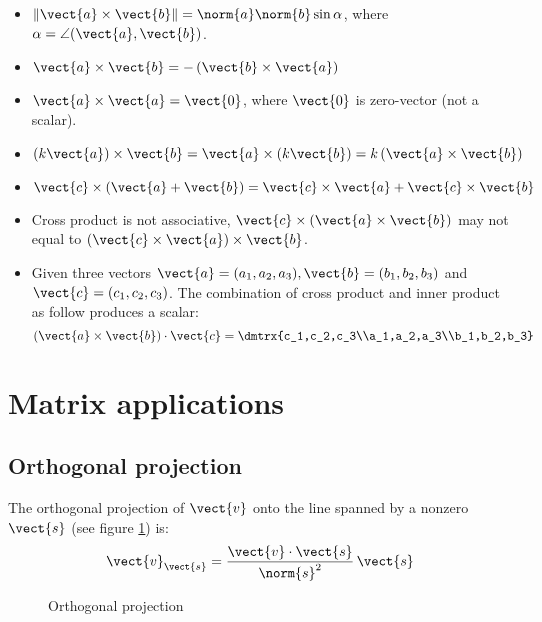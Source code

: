 \begin{itemize}
\item $\Vert\vect{a}\times\vect{b}\Vert = \norm{a}\norm{b}\sin\alpha$, where $\alpha=\angle (\vect{a},\vect{b})$.
\item $\vect{a}\times\vect{b}=-\left( \vect{b}\times\vect{a} \right)$ 
\item $\vect{a}\times\vect{a}=\vect{0}$, where $\vect{0}$ is zero-vector (not a scalar).
\item $\left( k\vect{a} \right)\times\vect{b}=\vect{a}\times\left( k\vect{b} \right)=k\left( \vect{a}\times\vect{b} \right)$
\item $\vect{c}\times\left( \vect{a}+\vect{b} \right)=\vect{c}\times\vect{a}+\vect{c}\times\vect{b}$
\item Cross product is not associative, $\vect{c}\times\left( \vect{a}\times\vect{b} \right)$ may not equal to $\left( \vect{c}\times\vect{a} \right)\times\vect{b}$.
\item Given three vectors $\vect{a}=(a_1,a_2,a_3),\vect{b}=(b_1,b_2,b_3)$ and $\vect{c}=(c_1,c_2,c_3)$. The combination of cross product and inner product as follow produces a scalar:
	\begin{equation}
	\left( \vect{a}\times\vect{b} \right)\cdot\vect{c}=\dmtrx{c_1,c_2,c_3\\a_1,a_2,a_3\\b_1,b_2,b_3}
	\end{equation}
\end{itemize}

\section{Matrix applications}
\subsection{Orthogonal projection}
The orthogonal projection of $\vect{v}$ onto the line spanned by a nonzero $\vect{s}$ (see figure \ref{Linalg_projection}) is: 
\[ \vect{v}_{\vect{s}}=\frac{\vect{v}\cdot\vect{s}}{\norm{s}^2} \, \vect{s} \]

\begin{figure}[hbtp]
\caption{Orthogonal projection}
\label{Linalg_projection}
\centering
\end{figure}

